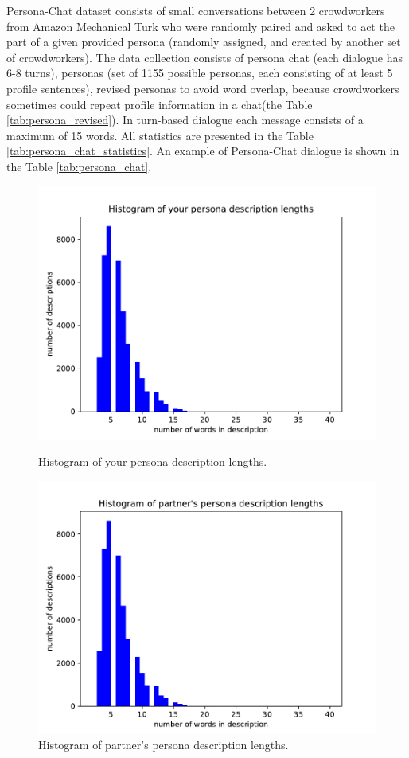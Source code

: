 Persona-Chat dataset consists of small conversations between 2 crowdworkers from Amazon Mechanical Turk who were randomly paired and asked to act the part of a given provided persona (randomly assigned, and created by another set of crowdworkers). The data collection consists of persona chat (each dialogue has 6-8 turns), personas (set of 1155 possible personas, each consisting of at least 5 profile sentences), revised personas to avoid word overlap, because crowdworkers sometimes could repeat profile information in a chat(the Table \ref{tab:persona_revised}). In turn-based dialogue each message consists of a maximum of 15 words. All statistics are presented in the Table \ref{tab:persona_chat_statistics}. An example of Persona-Chat dialogue is shown in the Table \ref{tab:persona_chat}. 

\begin{figure}[htb]
  \includegraphics[width=\linewidth]{figures/persona_desc.pdf}
  \caption{Histogram of your persona description lengths.}\label{fig:histogram_persona_desc}
\endminipage\hfill
{}
  \includegraphics[width=\linewidth]{figures/partner_desc.pdf}
  \caption{Histogram of partner's persona description lengths.}\label{fig:histogram_partner_desc}
\endminipage
\end{figure}


